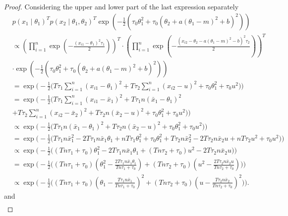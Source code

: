 \documentclass[english,twoside,openright]{HYgraduMLDS}
\begin{document}
\begin{appendices}
\begin{proof}
  Considering the upper and lower part of the last expression separately
  \begin{align*}
    &p(x_1\mid \theta_1)^Tp(x_2\mid \theta_1, \theta_2)^T
      \exp\left(-\frac{1}{2}\left(\tau_0\theta_1^2
      + \tau_0(\theta_2 + a(\theta_1 - m)^2 + b)^2\right)\right)
    \\&\propto \left(\prod_{i=1}^n \exp
    \left(-\frac{(x_{i1} - \theta_1)^2\tau_1}{2}\right)\right)^T
    \cdot\left(\prod_{i=1}^n \exp\left(-\frac{(x_{i2} - \theta_2
    - a(\theta_1 - m)^2 - b)^2\tau_2}{2}\right)\right)^T
    \\&\cdot \exp\left(-\frac{1}{2}\left(\tau_0\theta_1^2
    + \tau_0(\theta_2 + a(\theta_1 - m)^2 + b)^2\right)\right)
    \\&=\exp\Bigg(-\frac{1}{2}\Big(T\tau_1\sum_{i=1}^n
    (x_{i1} - \theta_1)^2
    + T\tau_2\sum_{i=1}^n(x_{i2} - u)^2
    + \tau_0\theta_1^2 + \tau_0 u^2\Big)\Bigg)
    \\&=\exp\Bigg(-\frac{1}{2}\Big(T\tau_1\sum_{i=1}^n
    (x_{i1} - \bar{x}_1)^2 + T\tau_1n(\bar{x}_1 - \theta_1)^2
    \\&+ T\tau_2\sum_{i=1}^n (x_{i2}  - \bar{x}_2)^2 + T\tau_2n(\bar{x}_2 - u)^2
    + \tau_0\theta_1^2 + \tau_0 u^2\Big)\Bigg)
    \\&\propto\exp\Bigg(-\frac{1}{2}\Big(T\tau_1n(\bar{x}_1 - \theta_1)^2
    + T\tau_2n(\bar{x}_2 - u)^2
    + \tau_0\theta_1^2 + \tau_0 u^2\Big)\Bigg)
    \\&=\exp\Bigg(-\frac{1}{2}\Big(T\tau_1n\bar{x}_1^2
    - 2T\tau_1n\bar{x}_1\theta_1 + nT\tau_1\theta_1^2 + \tau_0\theta_1^2
    + T\tau_2n\bar{x}_2^2 - 2T\tau_2n\bar{x}_2u + nT\tau_2u^2
    + \tau_0 u^2\Big)\Bigg)
    \\&\propto\exp\Bigg(-\frac{1}{2}\Big((Tn\tau_1 + \tau_0)\theta_1^2
    - 2T\tau_1n\bar{x}_1\theta_1
    + (Tn\tau_2 + \tau_0)u^2 - 2T\tau_2n\bar{x}_2u \Big)\Bigg)
    \\&=\exp\Bigg(-\frac{1}{2}\Big((Tn\tau_1 + \tau_0)\left(\theta_1^2
    - \frac{2T\tau_1n\bar{x}_1\theta_1}{Tn\tau_1 + \tau_0} \right)
    + (Tn\tau_2 + \tau_0)\left(u^2 - \frac{2T\tau_2n\bar{x}_2u}
    {Tn\tau_2 + \tau_0}\right) \Big)\Bigg)
    \\&\propto\exp\Bigg(-\frac{1}{2}\Big(
    (Tn\tau_1 + \tau_0)\left(\theta_1
    - \frac{T\tau_1n\bar{x}_1}{Tn\tau_1 + \tau_0} \right)^2
    + (Tn\tau_2 + \tau_0)\left(u - \frac{T\tau_2n\bar{x}_2}
    {Tn\tau_2 + \tau_0}\right)^2 \Big)\Bigg).
  \end{align*}
  and
  \begin{align*}

\end{align*}
\end{proof}
\end{appendices}
\end{document}
